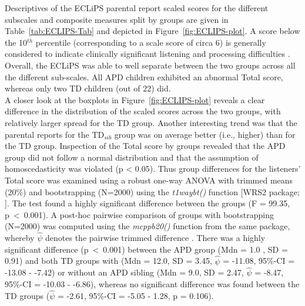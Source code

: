 \documentclass[a4paper, twoside]{templates/ociamthesis}
\begin{document}
Descriptives of the ECLiPS parental report scaled scores for the different subscales and composite measures split by groups are given in Table~\ref{tab:ECLIPS-Tab} and depicted in Figure~\ref{fig:ECLIPS-plot}. A score below the 10\(^{th}\) percentile (corresponding to a scale score of circa 6) is generally considered to indicate clinically significant listening and processing difficulties \autocite{Barry2014}. Overall, the ECLiPS was able to well separate between the two groups across all the different sub-scales. All APD children exhibited an abnormal Total score, whereas only two TD children (out of 22) did.\\

A closer look at the boxplots in Figure~\ref{fig:ECLIPS-plot} reveals a clear difference in the distribution of the scaled scores across the two groups, with relatively larger spread for the TD group. Another interesting trend was that the parental reports for the TD\(_{sib}\) group was on average better (i.e., higher) than for the TD group. Inspection of the Total score by groups revealed that the APD group did not follow a normal distribution and that the assumption of homoscedasticity was violated (p \textless{} 0.05). Thus group differences for the listeners' Total score was examined using a robust one-way ANOVA with trimmed means (20\%) and bootstrapping (N=2000) using the \emph{t1waybt()} function {[}WRS2 package; \textcite{WRS2PackageR}{]}. The test found a highly significant difference between the groups (F = 99.35, p~\textless~0.001). A post-hoc pairwise comparison of groups with bootstrapping (N=2000) was computed using the \emph{mcppb20()} function from the same package, whereby \(\hat{\psi}\) denotes the pairwise trimmed difference \autocite{WRS2PackageR}. There was a highly significant difference (p~\textless~0.001) between the APD group (Mdn = 1.0 , SD = 0.91) and both TD groups with (Mdn = 12.0, SD = 3.45, \(\hat{\psi}\) = -11.08, 95\%-CI = -13.08 - -7.42) or without an APD sibling (Mdn = 9.0, SD = 2.47, \(\hat{\psi}\) = -8.47, 95\%-CI = -10.03 - -6.86), whereas no significant difference was found between the TD groups (\(\hat{\psi}\) = -2.61, 95\%-CI = -5.05 - 1.28, p = 0.106).\\
\end{document}
